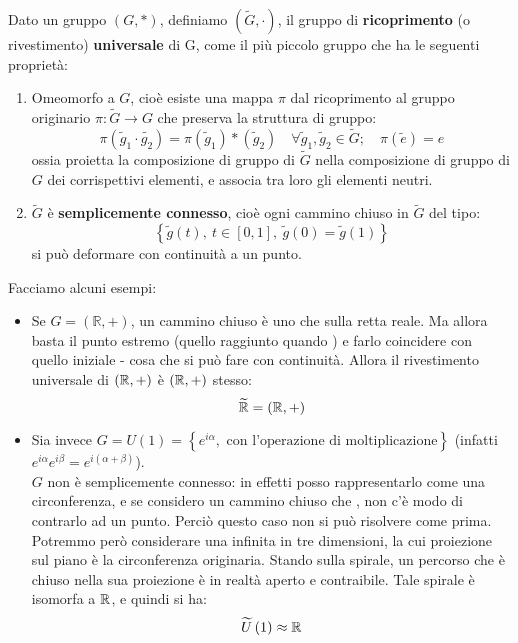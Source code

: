 \documentclass[../../FisicaTeorica.tex]{subfiles}
\begin{document}
\begin{dfn}
Dato un gruppo $(G,*)$, definiamo $(\widetilde{G},\cdot)$, il gruppo di \textbf{ricoprimento} (o rivestimento) \textbf{universale} di G, come il più piccolo gruppo che ha le seguenti proprietà:
\begin{enumerate}
    \item Omeomorfo a $G$, cioè esiste una mappa $\pi$ dal ricoprimento al gruppo originario $\pi :\widetilde{G}\to G$ che preserva la struttura di gruppo:
\[
    \pi(\tilde{g}_1 \cdot \tilde{g_2}) = \pi(\tilde{g}_1) * (\tilde{g}_2)\quad \forall \tilde{g}_1, \tilde{g}_2 \in \tilde{G}; \quad \pi(\tilde{e})=e
\]
ossia proietta la composizione di gruppo di $\tilde{G}$ nella composizione di gruppo di $G$ dei corrispettivi elementi, e associa tra loro gli elementi neutri.
        \item $\widetilde{G}$ è \textbf{semplicemente connesso}, cioè ogni cammino chiuso in $\widetilde{G}$ del tipo:
\[
\left\{\widetilde{g}\left(t\right),\ t\in\left[0,1\right],\ \widetilde{g}\left(0\right)=\widetilde{g}(1)\right\}
\]
si può deformare con continuità a un punto.
\end{enumerate}
\end{dfn}
Facciamo alcuni esempi: %
\begin{itemize}
\item Se $G=\left(\mathbb{R},+\right)$, un cammino chiuso è uno che  sulla retta reale. Ma allora basta  il punto estremo (quello raggiunto quando ) e farlo coincidere con quello iniziale - cosa che si può fare con continuità. Allora il rivestimento universale di $(\mathbb{R},+)$ è $(\mathbb{R},+)$ stesso:
\[
\widetilde{\mathbb{R}}=(\mathbb{R},+)
\]
\item Sia invece $G=U\left(1\right)= \left\{e^{i\alpha},\text{ con l'operazione di moltiplicazione}\right\}$ (infatti $e^{i\alpha}e^{i\beta}=e^{i\left(\alpha+\beta\right)}$).\\
$G$ non è semplicemente connesso: in effetti posso rappresentarlo come una circonferenza, e se considero un cammino chiuso che , non c'è modo di contrarlo ad un punto. Perciò questo caso non si può risolvere come prima.\\
Potremmo però considerare una  infinita in tre dimensioni, la cui proiezione sul piano è la circonferenza originaria. Stando sulla spirale, un percorso che è chiuso nella sua proiezione è in realtà aperto e contraibile. Tale spirale è isomorfa a $\mathbb{R}$, e quindi si ha:
\[\widetilde{U}\left(1\right)\approx \mathbb{R}
\]
\end{itemize}
\end{document}
